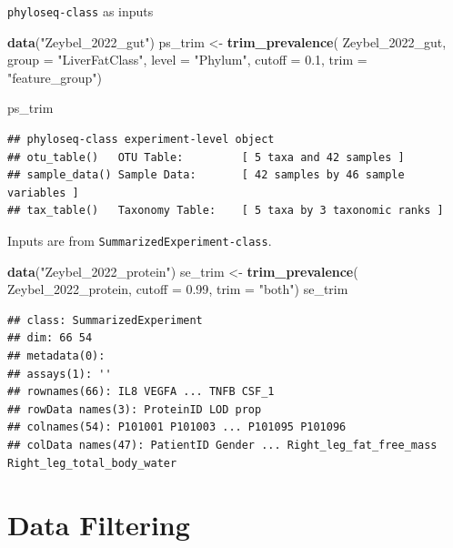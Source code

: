 \documentclass[
]{book}
\newenvironment{Shaded}{\begin{snugshade}}{\end{snugshade}}
\newcommand{\AttributeTok}[1]{\textcolor[rgb]{0.13,0.29,0.53}{#1}}
\newcommand{\FloatTok}[1]{\textcolor[rgb]{0.00,0.00,0.81}{#1}}
\newcommand{\FunctionTok}[1]{\textcolor[rgb]{0.13,0.29,0.53}{\textbf{#1}}}
\newcommand{\NormalTok}[1]{#1}
\newcommand{\OtherTok}[1]{\textcolor[rgb]{0.56,0.35,0.01}{#1}}
\newcommand{\StringTok}[1]{\textcolor[rgb]{0.31,0.60,0.02}{#1}}
\begin{document}
\texttt{phyloseq-class} as inputs

\begin{Shaded}
\begin{Highlighting}[]
\FunctionTok{data}\NormalTok{(}\StringTok{"Zeybel\_2022\_gut"}\NormalTok{)}
\NormalTok{ps\_trim }\OtherTok{\textless{}{-}} \FunctionTok{trim\_prevalence}\NormalTok{(}
\NormalTok{  Zeybel\_2022\_gut,}
  \AttributeTok{group =} \StringTok{"LiverFatClass"}\NormalTok{,}
  \AttributeTok{level =} \StringTok{"Phylum"}\NormalTok{,}
  \AttributeTok{cutoff =} \FloatTok{0.1}\NormalTok{,}
  \AttributeTok{trim =} \StringTok{"feature\_group"}\NormalTok{)}

\NormalTok{ps\_trim}
\end{Highlighting}
\end{Shaded}

\begin{verbatim}
## phyloseq-class experiment-level object
## otu_table()   OTU Table:         [ 5 taxa and 42 samples ]
## sample_data() Sample Data:       [ 42 samples by 46 sample variables ]
## tax_table()   Taxonomy Table:    [ 5 taxa by 3 taxonomic ranks ]
\end{verbatim}

Inputs are from \texttt{SummarizedExperiment-class}.

\begin{Shaded}
\begin{Highlighting}[]
\FunctionTok{data}\NormalTok{(}\StringTok{"Zeybel\_2022\_protein"}\NormalTok{)}
\NormalTok{se\_trim }\OtherTok{\textless{}{-}} \FunctionTok{trim\_prevalence}\NormalTok{(}
\NormalTok{  Zeybel\_2022\_protein,}
  \AttributeTok{cutoff =} \FloatTok{0.99}\NormalTok{,}
  \AttributeTok{trim =} \StringTok{"both"}\NormalTok{)}
\NormalTok{se\_trim}
\end{Highlighting}
\end{Shaded}

\begin{verbatim}
## class: SummarizedExperiment 
## dim: 66 54 
## metadata(0):
## assays(1): ''
## rownames(66): IL8 VEGFA ... TNFB CSF_1
## rowData names(3): ProteinID LOD prop
## colnames(54): P101001 P101003 ... P101095 P101096
## colData names(47): PatientID Gender ... Right_leg_fat_free_mass Right_leg_total_body_water
\end{verbatim}

\hypertarget{data-filtering}{%
\section{Data Filtering}\label{data-filtering}}
\end{document}
